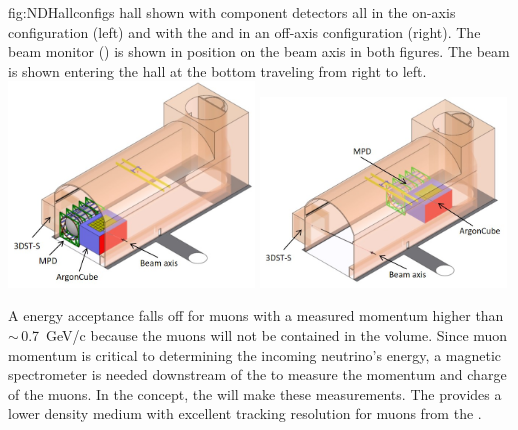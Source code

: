 \begin{dunefigure}
{fig:NDHallconfigs}
{  hall shown with component detectors all in the on-axis configuration (left) and with the  and  in an off-axis configuration (right). The %
beam monitor () is shown in position on the beam axis in both figures. The beam is shown entering the hall at the bottom traveling from right to left.}
\includegraphics[width=0.49\textwidth]{graphics/NDHall_onaxis.jpg}
\includegraphics[width=0.49\textwidth]{graphics/NDHall_offaxis.jpg}
\end{dunefigure}

A  energy acceptance falls off for muons with a measured momentum higher than $\sim\,$\SI{0.7}{GeV/c} because the muons will not be contained in the  volume.  Since muon momentum is critical to determining the incoming neutrino's energy, a magnetic spectrometer is needed downstream of the  to measure the momentum and charge of the muons.  %
In the   concept, the  will make these measurements. The  provides a lower density medium with excellent tracking resolution for muons from the .  



